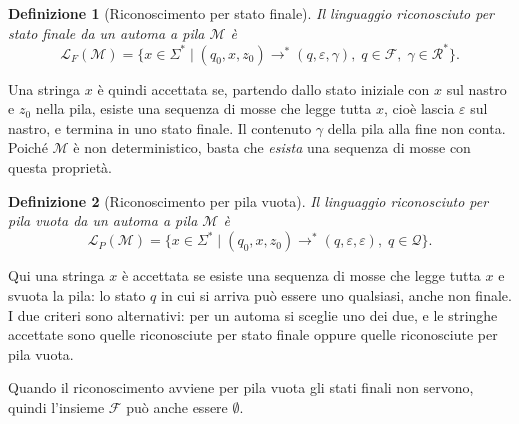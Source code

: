 \documentclass[a4paper, 11pt, oneside]{book}
\theoremstyle{formale}
\newtheorem*{definition}{Definizione}
\begin{document}
    \begin{definition}[Riconoscimento per stato finale]
        Il linguaggio riconosciuto \emph{per stato finale} da un automa a pila
        $\mathcal{M}$ \`e
        \begin{equation*}
            \mathcal{L}_F(\mathcal{M}) = \{x \in \Sigma^* \mid
            (q_0, x, z_0) \longrightarrow^* (q, \varepsilon, \gamma
           ),\; q \in \mathcal{F},\; \gamma \in \mathcal{R}^*\}.
        \end{equation*}
    \end{definition}
    Una stringa $x$ \`e quindi accettata se, partendo dallo stato iniziale con $x$ sul
    nastro e $z_0$ nella pila, esiste una sequenza di mosse che legge tutta $x$, cio\`e
    lascia $\varepsilon$ sul nastro, e termina in uno stato finale. Il contenuto $\gamma$
    della pila alla fine non conta. Poich\'e $\mathcal{M}$ \`e non deterministico, basta
    che \emph{esista} una sequenza di mosse con questa propriet\`a.

    \begin{definition}[Riconoscimento per pila vuota]
        Il linguaggio riconosciuto \emph{per pila vuota} da un automa a pila
        $\mathcal{M}$ \`e
        \begin{equation*}
            \mathcal{L}_P(\mathcal{M}) = \{x \in \Sigma^* \mid
            (q_0, x, z_0) \longrightarrow^* (q, \varepsilon,
            \varepsilon),\; q \in \mathcal{Q}\}.
        \end{equation*}
    \end{definition}
    Qui una stringa $x$ \`e accettata se esiste una sequenza di mosse che legge tutta $x$
    e svuota la pila: lo stato $q$ in cui si arriva pu\`o essere uno qualsiasi, anche non
    finale. I due criteri sono alternativi: per un automa si sceglie uno dei due, e le
    stringhe accettate sono quelle riconosciute per stato finale oppure quelle
    riconosciute per pila vuota.

    Quando il riconoscimento avviene per pila vuota gli stati finali non servono, quindi
    l'insieme $\mathcal{F}$ pu\`o anche essere $\emptyset$.
\end{document}

